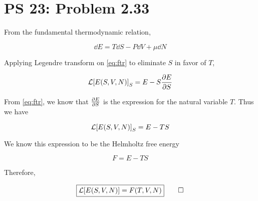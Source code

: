 \documentclass[12pt,a4paper]{article}
\begin{document}
\setcounter{page}{1}

\section*{PS 23: Problem 2.33}
\bigskip

From the fundamental thermodynamic relation,

\begin{equation}\label{eq:ftr}
	\dd{E} = T\dd{S} - P\dd{V} + \mu\dd{N}
\end{equation}

Applying Legendre transform on \eqref{eq:ftr} to eliminate $S$ in favor of $T$,

\begin{equation}
	\mathcal{L}\qty[E\qty(S,V,N)]_S = E - S\pdv{E}{S}
\end{equation}

From \eqref{eq:ftr}, we know that $\pdv{E}{S}$ is the expression for the natural variable $T$. Thus we have

\begin{equation}
	\mathcal{L}\qty[E\qty(S,V,N)]_S = E - TS
\end{equation}

We know this expression to be the Helmholtz free energy

\begin{equation}\label{eq:helmholtz}
		F = E - TS
\end{equation}

Therefore,

\begin{equation}\label{eq:answer}
	\boxed{
		\mathcal{L}\qty[E\qty(S,V,N)] = F\qty(T,V,N)
	} \qed
\end{equation}
\end{document}
